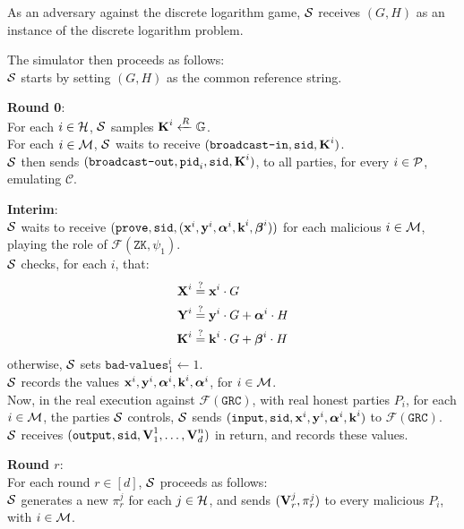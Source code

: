 As an adversary against the discrete logarithm game,
$\mathcal{S}$ receives $(G, H)$ as an instance 
of the discrete logarithm problem.

The simulator then proceeds as follows:\\
$\mathcal{S}$ starts by setting $(G, H)$ as the common reference string.

\textbf{Round 0}:\\
For each $i \in \mathcal{H}$, $\mathcal{S}$ samples $\textbf{K}^i \xleftarrow{R} \mathbb{G}$.\\
For each $i \in \mathcal{M}$,
$\mathcal{S}$ waits to receive $(\texttt{broadcast-in}, \texttt{sid}, \textbf{K}^i)$.\\
$\mathcal{S}$ then sends $(\texttt{broadcast-out}, \texttt{pid}_i, \texttt{sid}, \textbf{K}^i)$,
to all parties, for every $i \in \mathcal{P}$, emulating $\mathcal{C}$.

\textbf{Interim}:\\
$\mathcal{S}$ waits to receive $(\texttt{prove}, \texttt{sid}, (\textbf{x}^i, \textbf{y}^i, \boldsymbol{\alpha}^i, \textbf{k}^i, \boldsymbol{\beta}^i))$
for each malicious ${i \in \mathcal{M}}$,
playing the role of $\mathcal{F}(\texttt{ZK}, \psi_1)$.\\
$\mathcal{S}$ checks, for each $i$, that:
$$
\begin{aligned}
\textbf{X}^i &\stackrel{?}{=} \textbf{x}^i \cdot G\\
\textbf{Y}^i &\stackrel{?}{=} \textbf{y}^i \cdot G + \boldsymbol{\alpha}^i \cdot H\\
\textbf{K}^i &\stackrel{?}{=} \textbf{k}^i \cdot G + \boldsymbol{\beta}^i \cdot H
\end{aligned}
$$
otherwise, $\mathcal{S}$ sets $\texttt{bad-values}^i_1 \gets 1$.\\
$\mathcal{S}$ records the values $\textbf{x}^i, \textbf{y}^i, \boldsymbol{\alpha}^i, \textbf{k}^i, \boldsymbol{\alpha}^i$, for $i \in \mathcal{M}$.\\

Now, in the real execution against $\mathcal{F}(\texttt{GRC})$,
with real honest parties $P_i$, for
each $i \in \mathcal{M}$, the parties $\mathcal{S}$ controls, $\mathcal{S}$ sends
$(\texttt{input}, \texttt{sid}, \textbf{x}^i, \textbf{y}^i, \boldsymbol{\alpha}^i, \textbf{k}^i)$ to $\mathcal{F}(\texttt{GRC})$.\\
$\mathcal{S}$ receives $(\texttt{output}, \texttt{sid}, \textbf{V}^1_1, \ldots, \textbf{V}^n_d)$ in return,
and records these values.

\textbf{Round $r$}:\\
For each round $r \in [d]$, $\mathcal{S}$ proceeds as follows:\\
$\mathcal{S}$ generates a new $\pi^j_r$ for each $j \in \mathcal{H}$, and sends
$(\textbf{V}^j_r, \pi^j_r)$ to every malicious $P_i$, with $i \in \mathcal{M}$.

